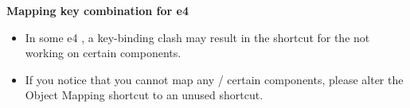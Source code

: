 \textbf{Mapping key combination for e4 \gdauts{}}
\begin{itemize}
\item In some e4 \gdauts{}, a key-binding clash may result in the shortcut for the \gdomm{} not working on certain components. 
\item If you notice that you cannot map any / certain components, please alter the Object Mapping shortcut to an unused shortcut. 
\end{itemize}
